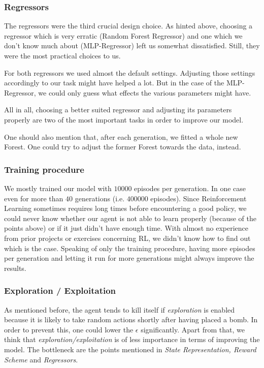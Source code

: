 \subsubsection{Regressors}
The regressors were the third crucial design choice. As hinted above, choosing a regressor which is very erratic (Random Forest Regressor) and one which we don't know much about (MLP-Regressor) left us somewhat dissatisfied. Still, they were the most practical choices to us.\par
For both regressors we used almost the default settings. Adjusting those settings accordingly to our task might have helped a lot. But in the case of the MLP-Regressor, we could only guess what effects the various parameters might have. \par

All in all, choosing a better suited regressor and adjusting its parameters properly are two of the most important tasks in order to improve our model.\par

One should also mention that, after each generation, we fitted a whole new Forest. One could try to adjust the former Forest towards the data, instead.

\subsubsection{Training procedure}
We mostly trained our model with $10000$ episodes per generation. In one case even for more than $40$ generations (i.e. $400000$ episodes). Since Reinforcement Learning sometimes requires long times before encountering a good policy, we could never know whether our agent is not able to learn properly (because of the points above) or if it just didn't have enough time. With almost no experience from prior projects or exercises concerning RL, we didn't know how to find out which is the case. Speaking of only the training procedure, having more episodes per generation and letting it run for more generations might always improve the results.

\subsubsection{Exploration / Exploitation}
As mentioned before, the agent tends to kill itself if \textit{exploration} is enabled because it is likely to take random actions shortly after having placed a bomb. In order to prevent this, one could lower the $\epsilon$ significantly. Apart from that, we think that \textit{exploration/exploitation} is of less importance in terms of improving the model. The bottleneck are the points mentioned in \textit{State Representation, Reward Scheme} and \textit{Regressors}. 

